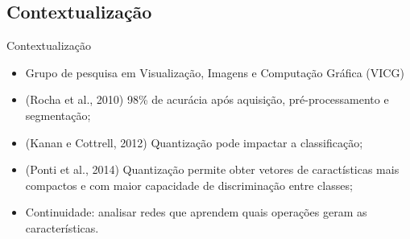 \documentclass{beamer}
\begin{document}
\subsection{Contextualização}
\begin{frame}{Contextualização}
\setlength\leftmargini{0em}
\justifying
  \begin{itemize}
\justifying
    \item Grupo de pesquisa em Visualização, Imagens e Computação Gráfica (VICG)
    \item <2-3> (Rocha et al., 2010) 98\% de acurácia após aquisição, pré-processamento e segmentação; %
    \item <2-3> (Kanan e Cottrell, 2012) Quantização pode impactar a classificação;
    \item <2-3> (Ponti et al., 2014) Quantização permite obter vetores de caractísticas mais compactos e com maior capacidade de discriminação entre classes;
    \item[]  {Continuidade: analisar redes que aprendem quais operações geram as características.}
  \end{itemize}
\end{frame}
\end{document}
